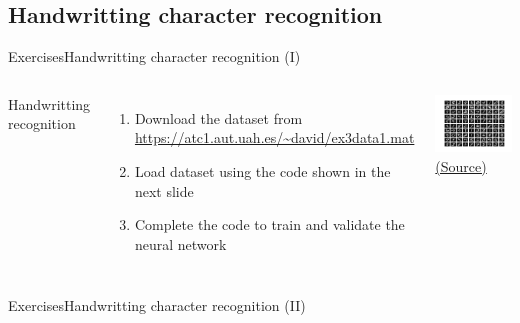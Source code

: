 \documentclass[10pt,compress]{beamer} %
\begin{document}
\subsection{Handwritting character recognition}
\begin{frame}{Exercises}{Handwritting character recognition (I)}
   \begin{columns}
	Handwritting recognition
	\begin{enumerate}
		\item Download the dataset from \url{https://atc1.aut.uah.es/~david/ex3data1.mat}
		\item Load dataset using the code shown in the next slide
		\item Complete the code to train and validate the neural network
	\end{enumerate}
		\begin{center}
		\includegraphics[width=\linewidth]{figs/hand.png}\\
	    \href{http://sujitpal.blogspot.com.es/2014/07/handwritten-digit-recognition-with.html}{(Source)}
		\end{center}
		\end{columns}
\end{frame}

\begin{frame}{Exercises}{Handwritting character recognition (II)}
    	\begin{block}{}
       \vspace{-0.2cm}
       
       \vspace{-0.2cm}
    	\end{block}
\end{frame}
\end{document}
